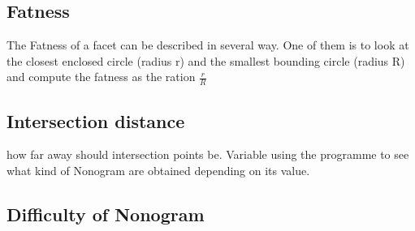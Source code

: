 \documentclass{article}
\begin{document}


\subsection{Fatness}
\label{fatness}
The Fatness of a facet can be described in several way. One of them is to look at the closest enclosed circle (radius r) and the smallest bounding circle (radius R) and compute the fatness as the ration $\frac{r}{R}$

\subsection{Intersection distance}
\label{intersection}
how far away should intersection points be. Variable using the programme to see what kind of Nonogram are obtained depending on its value.

\subsection{Difficulty of Nonogram}
\label{difficulty}
\end{document}
